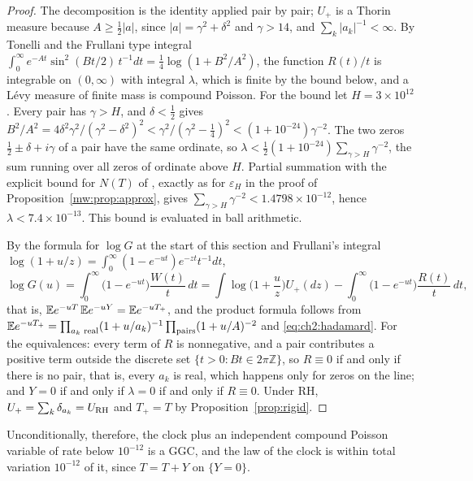 \begin{proof}
The decomposition is the identity applied pair by pair; $U_+$ is a Thorin measure because $A\ge\frac12|a|$, since $|a|=\gamma^2+\delta^2$ and $\gamma>14$, and $\sum_k|a_k|^{-1}<\infty$. By Tonelli and the Frullani type integral $\int_0^\infty e^{-At}\sin^2(Bt/2)\,t^{-1}dt=\frac14\log(1+B^2/A^2)$, the function $R(t)/t$ is integrable on $(0,\infty)$ with integral $\lambda$, which is finite by the bound below, and a L\'evy measure of finite mass is compound Poisson. For the bound let $H=3\times10^{12}$. Every pair has $\gamma>H$, and $\delta<\frac12$ gives $B^2/A^2=4\delta^2\gamma^2/(\gamma^2-\delta^2)^2<\gamma^2/(\gamma^2-\frac14)^2<(1+10^{-24})\gamma^{-2}$. The two zeros $\frac12\pm\delta+i\gamma$ of a pair have the same ordinate, so $\lambda<\frac12(1+10^{-24})\sum_{\gamma>H}\gamma^{-2}$, the sum running over all zeros of ordinate above $H$. Partial summation with the explicit bound for $N(T)$ of \cite[Corollary~1.2]{HSW22}, exactly as for $\varepsilon_H$ in the proof of Proposition~\ref{mw:prop:approx}, gives $\sum_{\gamma>H}\gamma^{-2}<1.4798\times10^{-12}$, hence $\lambda<7.4\times10^{-13}$. This bound is evaluated in ball arithmetic.

By the formula for $\log G$ at the start of this section and Frullani's integral $\log(1+u/z)=\int_0^\infty(1-e^{-ut})e^{-zt}t^{-1}dt$,
\[
\log G(u)=\int_0^\infty\big(1-e^{-ut}\big)\frac{W(t)}t\,dt=\int\log\Big(1+\frac uz\Big)U_+(dz)-\int_0^\infty\big(1-e^{-ut}\big)\frac{R(t)}t\,dt,
\]
that is, $\mathbb{E} e^{-uT}\,\mathbb{E} e^{-uY}=\mathbb{E} e^{-uT_+}$, and the product formula follows from $\mathbb{E} e^{-uT_+}=\prod_{a_k\text{ real}}(1+u/a_k)^{-1}\prod_{\text{pairs}}(1+u/A)^{-2}$ and \eqref{eq:ch2:hadamard}. For the equivalences: every term of $R$ is nonnegative, and a pair contributes a positive term outside the discrete set $\{t>0:Bt\in2\pi\mathbb Z\}$, so $R\equiv0$ if and only if there is no pair, that is, every $a_k$ is real, which happens only for zeros on the line; and $Y=0$ if and only if $\lambda=0$ if and only if $R\equiv0$. Under RH, $U_+=\sum_k\delta_{a_k}=U_{\mathrm{RH}}$ and $T_+=T$ by Proposition~\ref{prop:rigid}.
\end{proof}

\begin{remark}\label{xg:rem:defect}
Unconditionally, therefore, the clock plus an independent compound Poisson variable of rate below $10^{-12}$ is a GGC, and the law of the clock is within total variation $10^{-12}$ of it, since $T=T+Y$ on $\{Y=0\}$.
\end{remark}

